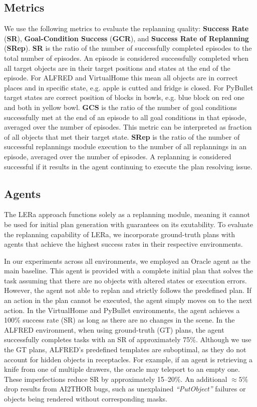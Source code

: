 \documentclass[letterpaper, 10 pt, conference]{ieeeconf}  %
\begin{document}
\subsection{Metrics}
We use the following metrics to evaluate the replanning quality: \textbf{Success Rate} (\textbf{SR}), \textbf{Goal-Condition Success} (\textbf{GCR}), and \textbf{Success Rate of Replanning} (\textbf{SRep}).  \textbf{SR} is the ratio of the number of successfully completed episodes to the total number of episodes. An episode is considered successfully completed when all target objects are in their target positions and states at the end of the episode. For ALFRED and VirtualHome  this mean all objects are in correct places and in specific state, e.g. apple is cutted and fridge is closed. For PyBullet target states are correct position of blocks in bowls, e.g. blue block on red one and both in yellow bowl. \textbf{GCS} is the ratio of the number of goal conditions successfully met at the end of an episode to all goal conditions in that episode, averaged over the number of episodes. This metric can be interpreted as fraction of all objects that met their target state. \textbf{SRep} is the ratio of the number of successful replannings module execution to the number of all replannings in an episode, averaged over the number of episodes. A replanning is considered successful if it results in the agent continuing to execute the plan resolving issue.


\subsection{Agents}
The LERa approach functions solely as a replanning module, meaning it cannot be used for initial plan generation with guarantees on its exutability. To evaluate the replanning capability of LERa, we incorporate ground-truth plans with agents that achieve the highest success rates in their respective environments.

In our experiments across all environments, we employed an Oracle agent as the main baseline. This agent is provided with a complete initial plan that solves the task assuming that there are no objects with altered states or execution errors. However, the agent not able to replan and strictly follows the predefined plan. If an action in the plan cannot be executed, the agent simply moves on to the next action.
In the VirtualHome and PyBullet environments, the agent achieves a 100\% success rate (SR) as long as there are no changes in the scene. In the ALFRED environment, when using ground-truth (GT) plans, the agent successfully completes tasks with an SR of approximately 75\%. Although we use the GT plans, ALFRED’s predefined templates are suboptimal, as they do not account for hidden objects in receptacles. For example, if an agent is retrieving a knife from one of multiple drawers, the oracle may teleport to an empty one. These imperfections reduce SR by approximately 15–20\%. An additional $\approx 5\%$ drop results from AI2THOR bugs, such as unexplained \textit{``PutObject''} failures or objects being rendered without corresponding masks.
\end{document}
